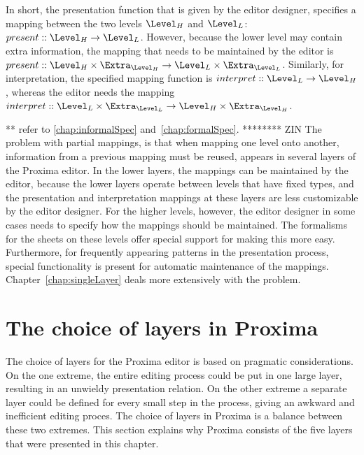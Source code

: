 In short, the presentation function that is given by the editor designer, specifies a mapping between the two levels $\Level_{H}$ and $\Level_{L}$:  $present :: \Level_{H} \rightarrow \Level_{L}$. However, because the lower level may contain extra information, the mapping that needs to be maintained by the editor is 
$present :: \Level_{H}\times \Extra_{\Level_{H}} \rightarrow \Level_{L}\times \Extra_{\Level_{L}}$. Similarly, for interpretation, the specified mapping function is 
$interpret :: \Level_{L} \rightarrow \Level_{H}$, whereas the editor needs the mapping 
$interpret :: \Level_{L} \times \Extra_{\Level_{L}} \rightarrow \Level_{H}\times \Extra_{\Level_{H}}$. 

** refer to \ref{chap:informalSpec} and~\ref{chap:formalSpec}.
******** ZIN
The problem with partial mappings, is that when mapping one level onto another, information from a previous mapping must be reused, appears in several layers of the Proxima editor. In the lower layers, the mappings can be maintained by the editor, because the lower layers operate between levels that have fixed types, and the presentation and interpretation mappings at these layers are less customizable by the editor designer. For the higher levels, however, the editor designer in some cases needs to specify how the mappings should be maintained. The formalisms for the sheets on these levels offer special support for making this more easy. Furthermore, for frequently appearing patterns in the presentation process, special functionality is present for automatic maintenance of the mappings. Chapter~\ref{chap:singleLayer} deals more extensively with the problem.
\ec

%																
%																
%																
\section{The choice of layers in Proxima}

The choice of layers for the Proxima editor is based on pragmatic considerations. On the one extreme, the entire editing process could be put in one large layer, resulting in an unwieldy presentation relation. On the other extreme a separate layer could be defined for every small step in the process, giving an awkward and inefficient editing proces. The choice of layers in Proxima is a balance between these two extremes. This section explains why Proxima consists of the five layers that were presented in this chapter.


